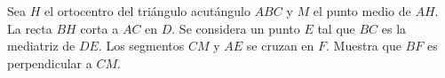 Sea $H$ el ortocentro del triángulo acutángulo $ABC$ y $M$ el punto medio de $AH$. La recta $BH$ corta a $AC$ en $D$. Se considera un punto $E$ tal que $BC$ es la mediatriz de $DE$. Los segmentos $CM$ y $AE$ se cruzan en $F$. Muestra que $BF$ es perpendicular a $CM$.